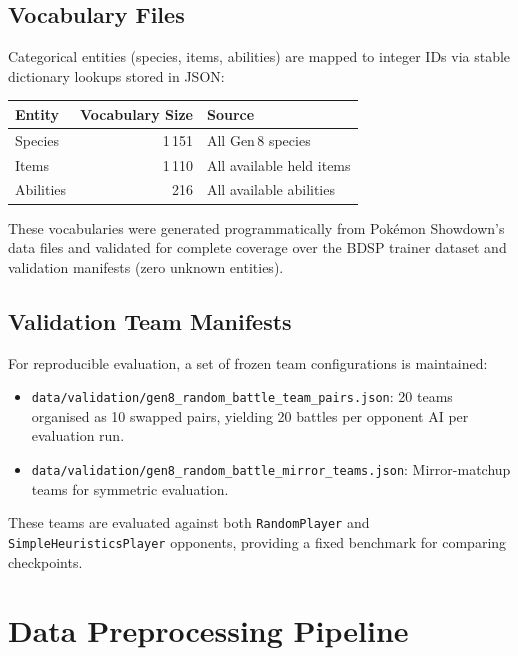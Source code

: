 \subsection{Vocabulary Files}

Categorical entities (species, items, abilities) are mapped to integer IDs via
stable dictionary lookups stored in JSON:

\begin{center}
\small
\begin{tabularx}{0.8\textwidth}{l r l}
  \toprule
  \textbf{Entity} & \textbf{Vocabulary Size} & \textbf{Source} \\
  \midrule
  Species  & 1\,151 & All Gen\,8 species \\
  Items    & 1\,110 & All available held items \\
  Abilities & 216   & All available abilities \\
  \bottomrule
\end{tabularx}
\end{center}

These vocabularies were generated programmatically from Pok\'{e}mon Showdown's
data files and validated for complete coverage over the BDSP trainer dataset
and validation manifests (zero unknown entities).

\subsection{Validation Team Manifests}

For reproducible evaluation, a set of frozen team configurations is maintained:

\begin{itemize}
  \item \texttt{data/validation/gen8\_random\_battle\_team\_pairs.json}:
        20 teams organised as 10 swapped pairs, yielding 20 battles per opponent AI per
        evaluation run.
  \item \texttt{data/validation/gen8\_random\_battle\_mirror\_teams.json}:
        Mirror-matchup teams for symmetric evaluation.
\end{itemize}

These teams are evaluated against both \texttt{RandomPlayer} and
\texttt{SimpleHeuristicsPlayer} opponents, providing a fixed benchmark for
comparing checkpoints.

\section{Data Preprocessing Pipeline}

